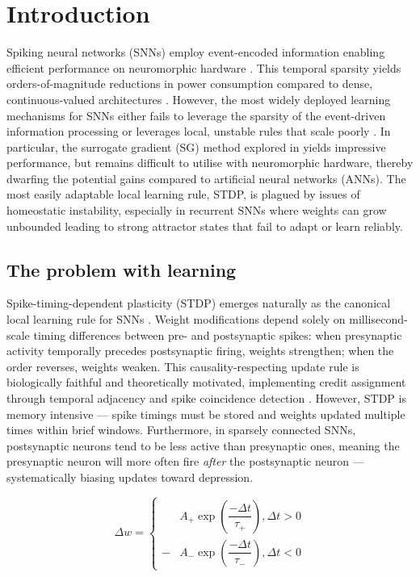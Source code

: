 \documentclass[runningheads]{llncs}
\begin{document}
\section{Introduction}
Spiking neural networks (SNNs) employ event-encoded information enabling efficient performance on neuromorphic hardware \cite{su_deep_2023}. This temporal sparsity yields orders-of-magnitude reductions in power consumption compared to dense, continuous-valued architectures \cite{isik_accelerating_2024}. However, the most widely deployed learning mechanisms for SNNs either fails to leverage the sparsity of the event-driven information processing or leverages local, unstable rules that scale poorly \cite{stratton_making_2022}. In particular, the surrogate gradient (SG) method explored in \cite{massey_sleep-based_2026} yields impressive performance, but remains difficult to utilise with neuromorphic hardware, thereby dwarfing the potential gains compared to artificial neural networks (ANNs). The most easily adaptable local learning rule, STDP, is plagued by issues of homeostatic instability, especially in recurrent SNNs where weights can grow unbounded leading to strong attractor states that fail to adapt or learn reliably.    

\subsection{The problem with learning}
Spike-timing-dependent plasticity (STDP) emerges naturally as the canonical local learning rule for SNNs \cite{song_competitive_2000}. Weight modifications depend solely on millisecond-scale timing differences between pre- and postsynaptic spikes: when presynaptic activity temporally precedes postsynaptic firing, weights strengthen; when the order reverses, weights weaken. This causality-respecting update rule is biologically faithful and theoretically motivated, implementing credit assignment through temporal adjacency and spike coincidence detection \cite{jayabal_experience_2024,chauhan_emergence_2018}. However, STDP is memory intensive — spike timings must be stored and weights updated multiple times within brief windows. Furthermore, in sparsely connected SNNs, postsynaptic neurons tend to be less active than presynaptic ones, meaning the presynaptic neuron will more often fire \textit{after} the postsynaptic neuron — systematically biasing updates toward depression.

\begin{equation}[!H]
    \Delta w = \begin{cases}
        &A_+ \exp\left(\dfrac{-\Delta t}{\tau_+}\right), \Delta t > 0 \\[12pt]
        -&A_- \exp\left(\dfrac{-\Delta t}{\tau_-}\right), \Delta t < 0
    \end{cases}
\end{equation}
\end{document}
